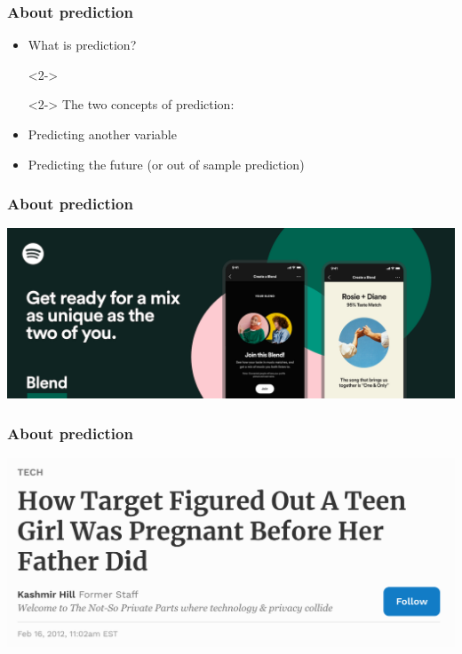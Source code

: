 \documentclass[aspectratio=43]{beamer}
\begin{document}
%
%
%

\begin{frame}
\frametitle{About prediction}
\centering

\begin{itemize}
  \item<1-> What is prediction?
  \item[]<2->
  \item[]<2-> The two concepts of prediction:
  \item<2-> Predicting another variable
  \item<2-> Predicting the future (or out of sample prediction)
\end{itemize}

\end{frame}

\begin{frame}
\frametitle{About prediction}
\centering

\includegraphics[width = \textwidth]{../img/spotify}

\end{frame}

\begin{frame}
\frametitle{About prediction}
\centering

\includegraphics[width = \textwidth]{../img/target_pregnancy}

\end{frame}
\end{document}
